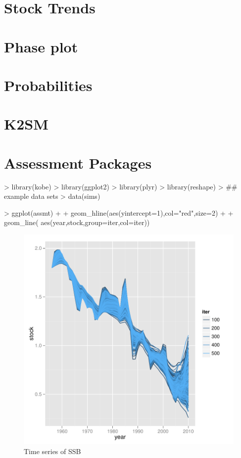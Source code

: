 \documentclass[a4paper, 11pt, oldtoc]{artikel1}
\begin{document}
\section{Stock Trends}

\section{Phase plot}

\section{Probabilities}

\section{K2SM}

\section{Assessment Packages}

\begin{Schunk}
\begin{Sinput}
> library(kobe)
> library(ggplot2)
> library(plyr)
> library(reshape)
> ## example data sets
> data(sims)
\end{Sinput}
\end{Schunk}

\begin{Schunk}
\begin{Sinput}
> ggplot(assmt)   + 
+   geom_hline(aes(yintercept=1),col="red",size=2)  + 
+   geom_line( aes(year,stock,group=iter,col=iter))
\end{Sinput}
\end{Schunk}


\begin{figure}
\begin{center}
\includegraphics{kobe-005}
\caption{Time series of SSB}
\end{center}
\end{figure}
\end{document}
